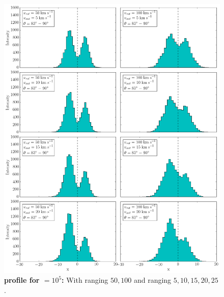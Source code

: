 \begin{figure}[h!]
	\begin{center}
		\includegraphics[width=1\textwidth]{./figures/chapter3/3_tau10E5_phi83-90}
	\end{center}
	\caption{\textbf{\lya profile for \tauh$=10^5$:} With \vrot ranging $50,100$ \kms and \vout ranging $5,10,15,20,25$ \kms.
		\label{fig:3_tau10E5_phi83-90}}
\end{figure}

